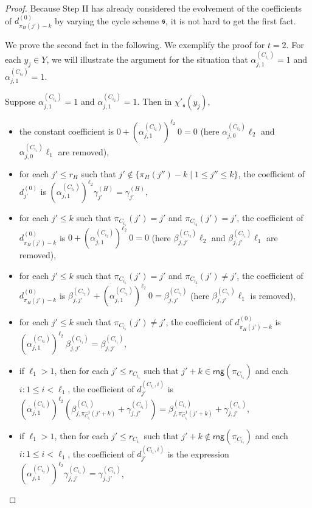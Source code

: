 \documentclass[runningheads,a4paper]{llncs}
\def\schm{{\mathfrak{s} }}
\newcommand\rng{\mathsf{rng}}
\begin{document}
\begin{proof}
Because Step II has already considered the evolvement of the coefficients of $d^{(0)}_{\pi_H(j')-k}$ by varying the cycle scheme $\schm$, it is not hard to get the first fact.

We prove the second fact in the following. We exemplify the proof for $t=2$. 
For each $y_j \in Y$, we will illustrate the argument for the situation that $\alpha^{(C_{i_1})}_{j,1} = 1$ and $\alpha^{(C_{i_2})}_{j,1} = 1$.

Suppose $\alpha^{(C_{i_1})}_{j,1} = 1$ and $\alpha^{(C_{i_2})}_{j,1} = 1$. Then in $\chi'_\schm(y_j)$,
\begin{itemize}
\item the constant coefficient is $0 + (\alpha^{(C_{i_2})}_{j,1})^{\ell_2}\  0 = 0$ (here $\alpha^{(C_{i_2})}_{j,0} \ell_2$ and $\alpha^{(C_{i_1})}_{j,0} \ell_1$ are removed),
%
%
\item for each $j' \le r_{H}$ such that $j' \not \in \{\pi_H(j'')-k \mid 1 \le j'' \le k\}$, the coefficient of $d^{(0)}_{j'}$ is $(\alpha^{(C_{i_2})}_{j,1})^{\ell_2} \gamma^{(H)}_{j'} = \gamma^{(H)}_{j'}$,
%
\item for each $j' \le k$ such that $\pi_{C_{i_1}}(j') = j'$ and $\pi_{C_{i_2}}(j') = j'$, the coefficient of $d^{(0)}_{\pi_H(j')-k}$ is $0 + (\alpha^{(C_{i_2})}_{j,1})^{\ell_2}\ 0 = 0$ (here $\beta^{(C_{i_2})}_{j,j'} \ell_2$ and $\beta^{(C_{i_1})}_{j,j'} \ell_1$ are removed),
%
\item for each $j' \le k$ such that $\pi_{C_{i_1}}(j') = j'$ and $\pi_{C_{i_2}}(j') \neq j'$, the coefficient of $d^{(0)}_{\pi_H(j')-k}$ is $\beta^{(C_{i_2})}_{j,j'} + (\alpha^{(C_{i_2})}_{j,1})^{\ell_2}\ 0 = \beta^{(C_{i_2})}_{j,j'}$ (here $\beta^{(C_{i_1})}_{j,j'} \ell_1$ is removed),
%
\item for each $j' \le k$ such that $\pi_{C_{i_1}}(j') \neq j'$, the coefficient of $d^{(0)}_{\pi_H(j')-k}$ is $(\alpha^{(C_{i_2})}_{j,1})^{\ell_2}\ \beta^{(C_{i_1})}_{j,j'} = \beta^{(C_{i_1})}_{j,j'}$,
%
\item if $\ell_1>1$, then for each $j' \le r_{C_{i_1}}$ such that $j'+k \in \rng(\pi_{C_{i_1}})$ and each $i: 1 \le i < \ell_1$, the coefficient of $d^{(C_{i_1},i)}_{j'}$ is $(\alpha^{(C_{i_2})}_{j,1})^{\ell_2} (\beta^{(C_{i_1})}_{j, \pi^{-1}_{C_{i_1}}(j'+k)}+\gamma^{(C_{i_1})}_{j,j'}) = \beta^{(C_{i_1})}_{j, \pi^{-1}_{C_{i_1}}(j'+k)}+\gamma^{(C_{i_1})}_{j,j'}$,
%
\item if $\ell_1>1$, then for each $j' \le r_{C_{i_1}}$ such that $j'+k \not \in \rng(\pi_{C_{i_1}})$ and each $i: 1 \le i < \ell_1$, the coefficient of $d^{(C_{i_1},i)}_{j'}$ is the expression $(\alpha^{(C_{i_2})}_{j,1})^{\ell_2} \gamma^{(C_{i_1})}_{j,j'} = \gamma^{(C_{i_1})}_{j,j'}$,

\end{itemize}
\end{proof}
\end{document}
